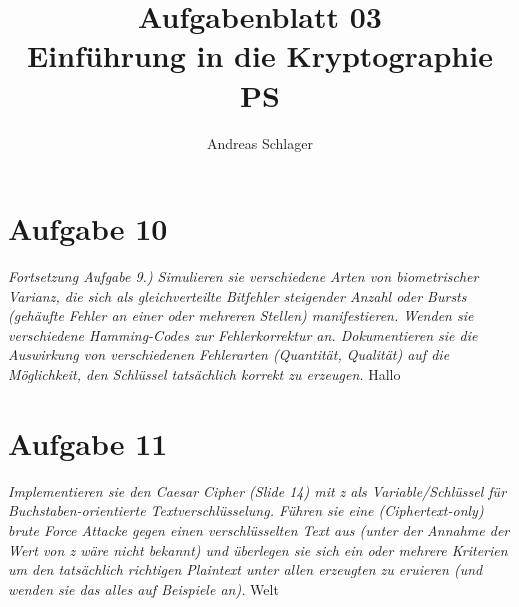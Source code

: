 \documentclass{article}
\title{{\Huge Aufgabenblatt 03}\\Einführung in die Kryptographie PS}
\author{Andreas Schlager}
\begin{document}
    \pagestyle{fancy}
    \fancyhead{}
    \fancyfoot{}
    \fancyfoot[R]{\thepage}
    \maketitle
    \tableofcontents
    \section{Aufgabe 10}
    \textit{Fortsetzung Aufgabe 9.) Simulieren sie verschiedene Arten von biometrischer Varianz, 
    die sich als gleichverteilte Bitfehler steigender Anzahl oder Bursts (gehäufte
    Fehler an einer oder mehreren Stellen) manifestieren. Wenden sie verschiedene
    Hamming-Codes zur Fehlerkorrektur an. Dokumentieren sie die Auswirkung von
    verschiedenen Fehlerarten (Quantität, Qualität) auf die Möglichkeit, den Schlüssel
    tatsächlich korrekt zu erzeugen.}\vspace*{1em}\newline
    Hallo

    \section{Aufgabe 11}
    \textit{Implementieren sie den Caesar Cipher (Slide 14) mit z als Variable/Schlüssel für
    Buchstaben-orientierte Textverschlüsselung. Führen sie eine (Ciphertext-only) brute
    Force Attacke gegen einen verschlüsselten Text aus (unter der Annahme der Wert
    von z wäre nicht bekannt) und überlegen sie sich ein oder mehrere Kriterien um den
    tatsächlich richtigen Plaintext unter allen erzeugten zu eruieren (und wenden sie das
    alles auf Beispiele an).}\vspace*{1em}\newline
    \newpage
    Welt
    \newpage
    
    
\end{document}

